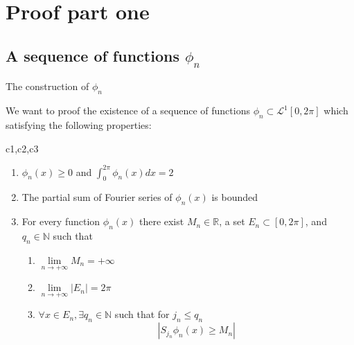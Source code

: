 \documentclass{beamer}
\begin{document}
\section{Proof part one}

\subsection{A sequence of functions $ \phi_n $}

\begin{frame}{The construction of $ \phi _n$}
    

We want to proof the existence of a sequence of functions $ \phi _n  \subset  \mathcal{L} ^1[0,2\pi] $ which satisfying the following properties:
\begin{block}{c1,c2,c3}
    \begin{enumerate}
        \item\label{C1}$ \phi_n(x)\geqslant 0 $ and $ \int_{0}^{2\pi}\phi_n(x)dx=2 $
        \item The partial sum of Fourier series of $ \phi_n(x) $ is bounded
        \item\label{C3} For every function $ \phi_n(x) $ there exist $ M_n  \in \mathbb{R}  $, a set $ E_n \subset [0,2\pi] $, and $ q_n \in \mathbb{N}  $ such that 
            \begin{enumerate}
                \item $ \lim\limits_{n\rightarrow +\infty}M_n = +\infty$
                \item $ \lim\limits_{n\rightarrow +\infty}\left\lvert E_n \right\rvert = 2 \pi $
                \item $ \forall x \in E_n, \exists q_n \in \mathbb{N}  $ such that for $ j_n \leqslant q_n $
                \[ \left\lvert S_{j_n}\phi_n(x)\geqslant M_n \right\rvert \]
            \end{enumerate}
        \end{enumerate}
\end{block}

\end{frame}
\end{document}
